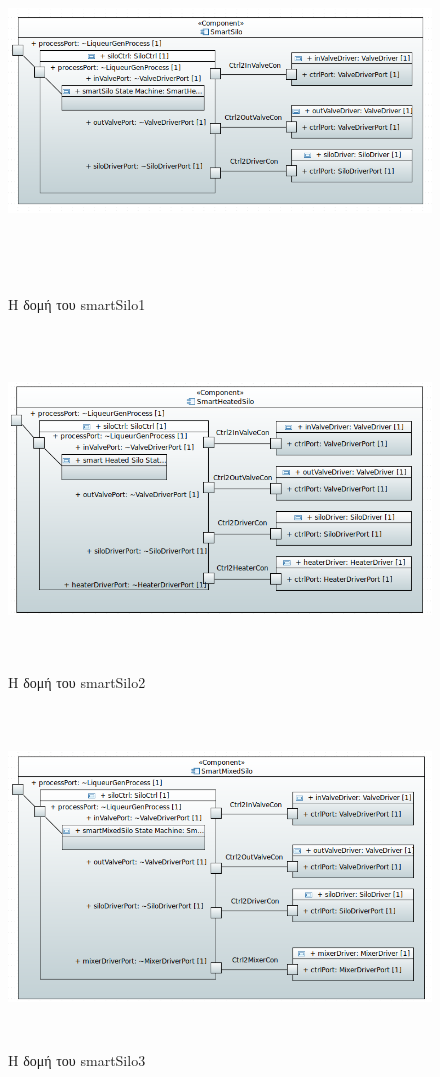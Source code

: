\begin{figure}[htbp]
	\centering
		\includegraphics[height=9.5cm,width=15cm]{Figures/13.png}
	\caption{H δομή του smartSilo1}	
\end{figure}
\begin{figure}[htbp]
	\centering
		\includegraphics[height=9cm,width=15cm]{Figures/14.png}
	\caption{H δομή του smartSilo2}	
\end{figure}
\begin{figure}[htbp]
	\centering
		\includegraphics[height=9cm,width=15cm]{Figures/15.png}
	\caption{H δομή του smartSilo3}	
\end{figure}
